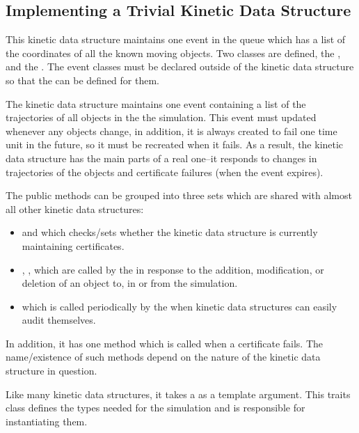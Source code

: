 
\subsection{Implementing a Trivial Kinetic Data Structure}
\label{sec:trivial_kds_example}

 This kinetic data structure maintains one event in the queue which
has a list of the coordinates of all the known moving objects.  Two
classes are defined, the , and the
. The event classes must be declared outside of the
kinetic data structure so that the  can be defined for
them. 

The kinetic data structure maintains one event containing a list of
the trajectories of all objects in the the simulation. This
event must updated whenever any objects change, in addition, it is
always created to fail one time unit in the future, so it must be
recreated when it fails. As a result, the kinetic data structure has
the main parts of a real one--it responds to changes in trajectories
of the objects and certificate failures (when the event expires).

 The public methods can be grouped into three sets which are shared
 with almost all other kinetic data structures:
\begin{itemize}
\item {} and  which
  checks/sets whether the kinetic data structure is currently
  maintaining certificates.
\item {}, ,  which are called by the
   in response to the
  addition, modification, or deletion of an object to, in or from the
  simulation.
\item {} which is called periodically by the
   when kinetic data structures can
  easily audit themselves.
\end{itemize} 

In addition, it has one method which is called when a certificate
fails. The name/existence of such methods depend on the nature of the
kinetic data structure in question.

Like many kinetic data structures, it takes a 
as a template argument. This traits class defines the types needed for
the simulation and is responsible for instantiating them.

 \label{fig:trivial_usage_program}
